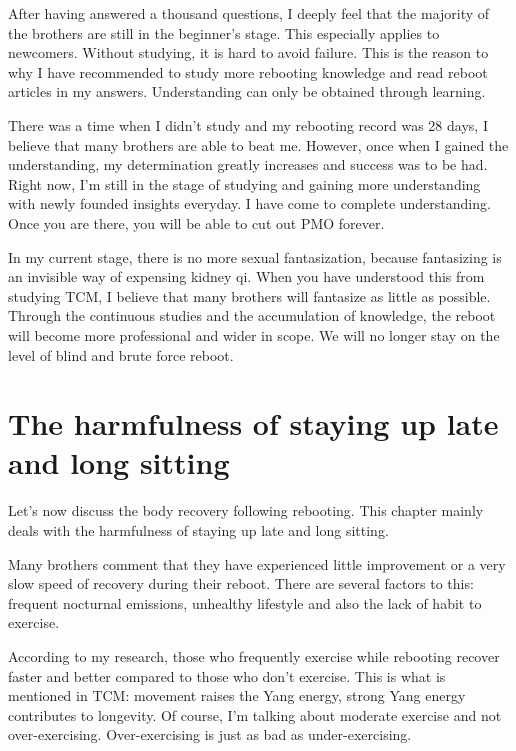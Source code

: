 \documentclass[
]{book}
\begin{document}
After having answered a thousand questions, I deeply feel that the majority of the brothers are still in the beginner's stage. This especially applies to newcomers. Without studying, it is hard to avoid failure. This is the reason to why I have recommended to study more rebooting knowledge and read reboot articles in my answers. Understanding can only be obtained through learning.

There was a time when I didn't study and my rebooting record was 28 days, I believe that many brothers are able to beat me. However, once when I gained the understanding, my determination greatly increases and success was to be had. Right now, I'm still in the stage of studying and gaining more understanding with newly founded insights everyday. I have come to complete understanding. Once you are there, you will be able to cut out PMO forever.

In my current stage, there is no more sexual fantasization, because fantasizing is an invisible way of expensing kidney qi. When you have understood this from studying TCM, I believe that many brothers will fantasize as little as possible. Through the continuous studies and the accumulation of knowledge, the reboot will become more professional and wider in scope. We will no longer stay on the level of blind and brute force reboot.

\hypertarget{the-harmfulness-of-staying-up-late-and-long-sitting}{%
\section{The harmfulness of staying up late and long sitting}\label{the-harmfulness-of-staying-up-late-and-long-sitting}}

Let's now discuss the body recovery following rebooting. This chapter mainly deals with the harmfulness of staying up late and long sitting.

Many brothers comment that they have experienced little improvement or a very slow speed of recovery during their reboot. There are several factors to this: frequent nocturnal emissions, unhealthy lifestyle and also the lack of habit to exercise.

According to my research, those who frequently exercise while rebooting recover faster and better compared to those who don't exercise. This is what is mentioned in TCM: movement raises the Yang energy, strong Yang energy contributes to longevity. Of course, I'm talking about moderate exercise and not over-exercising. Over-exercising is just as bad as under-exercising.
\end{document}
